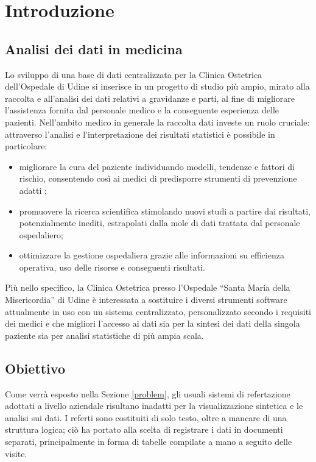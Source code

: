 \chapter{Introduzione}

\section{Analisi dei dati in medicina}

Lo sviluppo di una base di dati centralizzata per la Clinica Ostetrica dell'Ospedale di Udine si inserisce in un progetto di studio più ampio, mirato alla raccolta e all'analisi dei dati relativi a gravidanze e parti, al fine di migliorare l'assistenza fornita dal personale medico e la conseguente esperienza delle pazienti.
Nell'ambito medico in generale la raccolta dati investe un ruolo cruciale: attraverso l'analisi e l'interpretazione dei risultati statistici è possibile in particolare:
\begin{itemize}
\item migliorare la cura del paziente individuando modelli, tendenze e fattori di rischio, consentendo così ai medici di predisporre strumenti di prevenzione adatti \cite{Cor20,McC16};
\item promuovere la ricerca scientifica stimolando nuovi studi a partire dai risultati, potenzialmente inediti, estrapolati dalla mole di dati trattata dal personale ospedaliero;
\item ottimizzare la gestione ospedaliera grazie alle informazioni su efficienza operativa, uso delle risorse e conseguenti risultati.
\end{itemize}
Più nello specifico, la Clinica Ostetrica presso l'Ospedale \enquote{Santa Maria della Misericordia} di Udine è interessata a sostituire i diversi strumenti software attualmente in uso con un sistema centralizzato, personalizzato secondo i requisiti dei medici e che migliori l'accesso ai dati sia per la sintesi dei dati della singola paziente sia per analisi statistiche di più ampia scala.

\section{Obiettivo}

Come verrà esposto nella Sezione \ref{problem}, gli usuali sistemi di refertazione adottati a livello aziendale risultano inadatti per la visualizzazione sintetica e le analisi sui dati.
I referti sono costituiti di solo testo, oltre a mancare di una struttura logica; ciò ha portato alla scelta di registrare i dati in documenti separati, principalmente in forma di tabelle compilate a mano a seguito delle visite.

